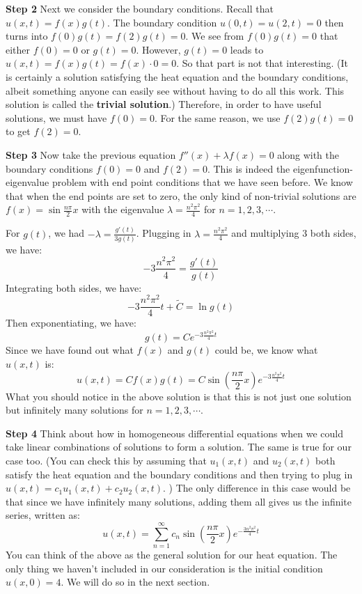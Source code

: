\documentclass[12pt]{report}
\begin{document}
\textbf{Step 2} Next we consider the boundary conditions. Recall that $u(x,t)=f(x)g(t)$. The boundary condition $u(0,t)=u(2,t)=0$ then turns into $f(0)g(t)=f(2)g(t)=0$. We see from $f(0)g(t)=0$ that either $f(0)=0$ or $g(t)=0$. However, $g(t)=0$ leads to $u(x,t)=f(x)g(t)=f(x)\cdot 0=0$. So that part is not that interesting. (It is certainly a solution satisfying the heat equation and the boundary conditions, albeit something anyone can easily see without having to do all this work. This solution is called the \textbf{trivial solution}.) Therefore, in order to have useful solutions, we must have $f(0)=0$. For the same reason, we use $f(2)g(t)=0$ to get $f(2)=0$.


\textbf{Step 3} Now take the previous equation $f''(x) + \lambda f(x) =0$ along with the boundary conditions $f(0)=0$ and $f(2)=0$. This is indeed the eigenfunction-eigenvalue problem with end point conditions that we have seen before. We know that when the end points are set to zero, the only kind of non-trivial solutions are $f(x)=\sin \frac{n\pi}{2} x$ with the eigenvalue $\lambda = \frac{n^2 \pi^2}{4}$ for $n=1,2,3, \cdots $.

For $g(t)$, we had $-\lambda=\frac{g'(t)}{3g(t)} $. Plugging in $\lambda = \frac{n^2 \pi^2}{4}$ and multiplying 3 both sides, we have:
$$-3\frac{n^2 \pi^2}{4}=\frac{g'(t)}{g(t)} $$
Integrating both sides, we have:
$$-3\frac{n^2 \pi^2}{4} t + \tilde{C} = \ln g(t) $$
Then exponentiating, we have:
$$g(t) = C e^{-3\frac{n^2 \pi^2}{4} t}$$
Since we have found out what $f(x)$ and $g(t)$ could be, we know what $u(x,t)$ is:
$$u(x,t) = C f(x) g(t) = C \sin \left(\frac{n\pi}{2} x \right) e^{-3\frac{n^2 \pi^2}{4} t}$$
What you should notice in the above solution is that this is not just one solution but infinitely many solutions for $n=1,2,3, \cdots $.

\textbf{Step 4} Think about how in homogeneous differential equations when we could take linear combinations of solutions to form a solution. The same is true for our case too. (You can check this by assuming that $u_1(x,t)$ and $u_2(x,t)$ both satisfy the heat equation and the boundary conditions and then trying to plug in $u(x,t) = c_1 u_1(x,t) + c_2 u_2(x,t)$. ) The only difference in this case would be that since we have infinitely many solutions, adding them all gives us the infinite series, written as:
$$u(x,t) = \sum_{n=1}^{\infty} c_n \sin \left(\frac{n\pi}{2} x \right) e^{-\frac{3n^2 \pi^2}{4} t}$$
You can think of the above as the general solution for our heat equation. The only thing we haven't included in our consideration is the initial condition $u(x,0)=4$. We will do so in the next section.
\end{document}
